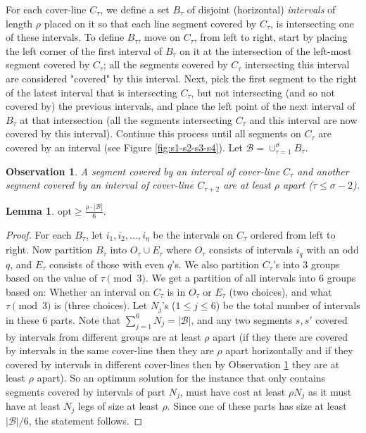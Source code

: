 \documentclass[pdflatex,sn-mathphys-num]{sn-jnl}
\theoremstyle{thmstyleone}
\newtheorem{lemma}{Lemma}
\newtheorem{observation}{Observation} %
\newcommand{\opt}{{\text{opt}}}
\begin{document}
For each cover-line $C_\tau$, we define a set $B_\tau$ of disjoint (horizontal) {\em intervals} of length $\rho$ placed on it so that each line segment covered by $C_\tau$, is intersecting one of these intervals. To define $B_\tau$, move on $ C_\tau $, from left to right, start by placing the left corner of the first interval of $B_\tau$ on it at the intersection of the left-most segment covered by $C_\tau$; all the segments covered by $C_\tau$ intersecting this interval are considered "covered" by this interval. Next, pick the first segment to the right of the latest interval that is intersecting $C_\tau$, but not intersecting (and so not covered by) the previous intervals, and place the left point of the next interval of $B_\tau$ at that intersection (all the segments intersecting $C_\tau$ and this interval are now covered by this interval). Continue this process until all segments on $ C_\tau $ are covered by an interval (see Figure \ref{fig:s1-s2-s3-s4}). 
Let $\mathcal B=\cup_{\tau=1}^\sigma B_\tau$.

\begin{observation}\label{obs:box-apart}
    A segment covered by an interval of cover-line $C_\tau$ and another segment covered by an interval of cover-line $C_{\tau+2}$ are at least $\rho$ apart ($\tau\leq \sigma-2$). 
\end{observation}

\begin{lemma}\label{lemma:box-size-opt-ineq}
    $\displaystyle\opt\geq \frac{\rho\cdot |\mathcal B|}{6}.$
\end{lemma}
\begin{proof}
For each $B_\tau$, let $i_1, i_2,\dots, i_\eta$ be the intervals on $ C_\tau $ ordered from left to right. Now partition $ B_\tau $ into $ O_\tau \cup E_\tau $ where
	$O_\tau$ consists of intervals $i_q$ with an odd $q$, and $E_\tau$ consists of those with even $q$'s. We also partition $C_\tau$'s into 3 groups based on the value of $\tau\pmod 3$.
	We get a partition of all intervals into 6 groups based on: Whether an interval on $C_\tau$ is in $O_\tau$ or $E_\tau$ (two choices), and what $\tau \pmod 3$ is (three choices). 
	Let $N_j$'s ($1\leq j\leq 6$) be the total number of intervals in these 6 parts. 
	Note that $\sum_{j=1}^6 N_j=|\mathcal B|$, and any two segments $s,s'$ covered by intervals from different groups are at least $\rho$ apart (if they there are 
	covered by intervals in the same cover-line then they are $\rho$ apart horizontally and if they covered by intervals in different cover-lines then by Observation \ref{obs:box-apart} they are at least $\rho$ apart).
	So an optimum solution for the instance that only contains segments covered by intervals of part $N_j$, must have cost at least $\rho N_j$ as it must have at least $N_j$ legs of size at least $\rho$. Since one of these parts has size at least $|\mathcal B|/6$, the statement follows.
\end{proof}
\end{document}
